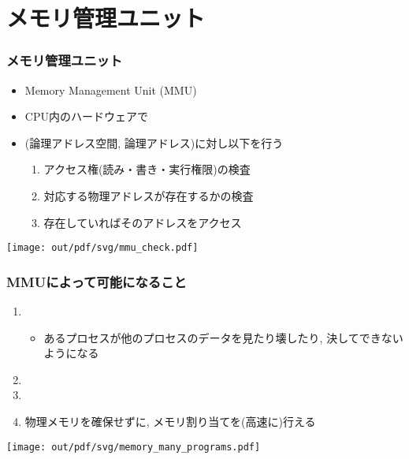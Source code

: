 \documentclass[12pt,dvipdfmx]{beamer}
\begin{document}
\section{メモリ管理ユニット}

\begin{frame}
  \frametitle{メモリ管理ユニット}
  \begin{itemize}
  \item Memory Management Unit (MMU)
  \item CPU内のハードウェアで
  \item (論理アドレス空間, 論理アドレス)に対し以下を行う
    \begin{enumerate}
    \item アクセス権(読み・書き・実行権限)の検査
    \item 対応する物理アドレスが存在するかの検査
    \item 存在していればそのアドレスをアクセス
    \end{enumerate}
  \end{itemize}
  \begin{center}
    \texttt{[image: out/pdf/svg/mmu\_check.pdf]}
  \end{center}
\end{frame}

\begin{frame}
  \frametitle{MMUによって可能になること}
  \begin{enumerate}
  \item {}
    \begin{itemize}
    \item あるプロセスが他のプロセスのデータを見たり壊したり,
      決してできないようになる
    \end{itemize}
  \item {}
  \item {}
  \item {}
    物理メモリを確保せずに, メモリ割り当てを(高速に)行える
  \end{enumerate}
  \begin{center}
    \texttt{[image: out/pdf/svg/memory\_many\_programs.pdf]}
  \end{center}
\end{frame}

\end{document}
